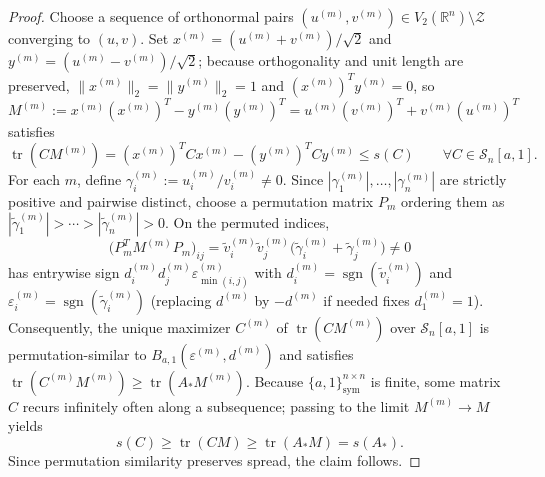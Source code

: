 \documentclass[11pt,reqno]{article}
\theoremstyle{definition}
\newcommand{\R}{\mathbb{R}}
\newcommand{\tr}{\operatorname{tr}}
\newcommand{\sgn}{\operatorname{sgn}}
\begin{document}
\begin{proof}
Choose a sequence of orthonormal pairs $(u^{(m)}, v^{(m)}) \in V_2(\R^n) \setminus \mathcal{Z}$ converging to $(u, v)$. Set $x^{(m)} = (u^{(m)} + v^{(m)})/\sqrt{2}$ and $y^{(m)} = (u^{(m)} - v^{(m)})/\sqrt{2}$; because orthogonality and unit length are preserved, $\|x^{(m)}\|_2 = \|y^{(m)}\|_2 = 1$ and $(x^{(m)})^T y^{(m)} = 0$, so $M^{(m)} := x^{(m)}(x^{(m)})^T - y^{(m)}(y^{(m)})^T = u^{(m)}(v^{(m)})^T + v^{(m)}(u^{(m)})^T$ satisfies
\[
\tr(C M^{(m)}) = (x^{(m)})^T C x^{(m)} - (y^{(m)})^T C y^{(m)} \le s(C) \qquad \forall C \in \mathcal{S}_n[a, 1].
\]
For each $m$, define $\gamma_i^{(m)} := u_i^{(m)} / v_i^{(m)} \ne 0$. Since $|\gamma_1^{(m)}|, \dots, |\gamma_n^{(m)}|$ are strictly positive and pairwise distinct, choose a permutation matrix $P_m$ ordering them as $|\tilde{\gamma}_1^{(m)}| > \cdots > |\tilde{\gamma}_n^{(m)}| > 0$. On the permuted indices,
\[
\bigl(P_m^T M^{(m)} P_m\bigr)_{ij} = \tilde{v}_i^{(m)} \tilde{v}_j^{(m)} \bigl(\tilde{\gamma}_i^{(m)} + \tilde{\gamma}_j^{(m)}\bigr) \ne 0
\]
has entrywise sign $d_i^{(m)} d_j^{(m)} \varepsilon_{\min(i,j)}^{(m)}$ with $d_i^{(m)} = \sgn(\tilde{v}_i^{(m)})$ and $\varepsilon_i^{(m)} = \sgn(\tilde{\gamma}_i^{(m)})$ (replacing $d^{(m)}$ by $-d^{(m)}$ if needed fixes $d_1^{(m)} = 1$). Consequently, the unique maximizer $C^{(m)}$ of $\tr(C M^{(m)})$ over $\mathcal{S}_n[a, 1]$ is permutation-similar to $B_{a,1}(\varepsilon^{(m)}, d^{(m)})$ and satisfies $\tr(C^{(m)} M^{(m)}) \ge \tr(A_* M^{(m)})$. Because $\{a, 1\}^{n \times n}_{\text{sym}}$ is finite, some matrix $C$ recurs infinitely often along a subsequence; passing to the limit $M^{(m)} \to M$ yields
\[
s(C) \ge \tr(C M) \ge \tr(A_* M) = s(A_*).
\]
Since permutation similarity preserves spread, the claim follows.
\end{proof}
\end{document}
